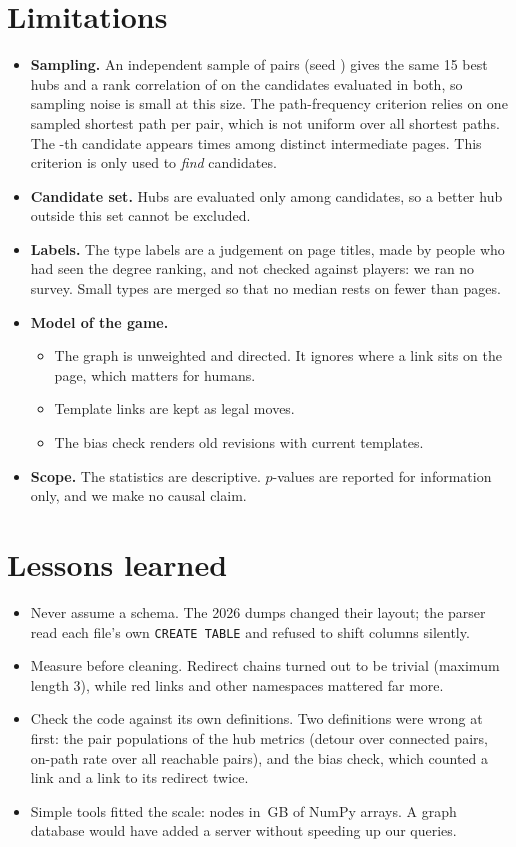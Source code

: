 \documentclass[10pt,a4paper]{article}
\begin{document}
\section{Limitations}
\begin{itemize}
\item \textbf{Sampling.} An independent sample of \NPairs{} pairs (seed \OtherSeed) gives the same
  15 best hubs \SeedTopFifteenOrder{} and a rank correlation of \SeedRho{} on the \SeedN{} candidates
  evaluated in both, so sampling noise is small at this size. The
  path-frequency criterion relies on one sampled shortest path per pair, which is not uniform over
  all shortest paths. The \TopK-th candidate appears \PathFreqKth{} times among
  \NDistinctOnPaths{} distinct intermediate pages. This criterion is only used to \emph{find}
  candidates.
\item \textbf{Candidate set.} Hubs are evaluated only among \NCandidates{} candidates, so a better
  hub outside this set cannot be excluded.
\item \textbf{Labels.} The type labels are a judgement on page titles, made by people who had
  seen the degree ranking, and not checked against players: we ran no survey. Small types are
  merged so that no median rests on fewer than \MinTypeSize{} pages.\item \textbf{Model of the game.}
  \begin{itemize}
  \item The graph is unweighted and directed. It ignores where a link sits on the page, which
    matters for humans.
  \item Template links are kept as legal moves.
  \item The bias check renders old revisions with current templates.
  \end{itemize}
\item \textbf{Scope.} The statistics are descriptive. $p$-values are reported for information
  only, and we make no causal claim.
\end{itemize}

\section{Lessons learned}
\begin{itemize}
\item Never assume a schema. The 2026 dumps changed their layout; the parser read each file's own
  \texttt{CREATE TABLE} and refused to shift columns silently.
\item Measure before cleaning. Redirect chains turned out to be trivial (maximum length 3), while
  red links and other namespaces mattered far more.
\item Check the code against its own definitions. Two definitions were wrong at first: the pair
  populations of the hub metrics (detour over connected pairs, on-path rate over all reachable
  pairs), and the bias check, which counted a link and a link to its redirect twice.
\item Simple tools fitted the scale: \NArticles{} nodes in \CsrDiskGB\,GB of NumPy arrays. A graph database
  would have added a server without speeding up our queries.
\end{itemize}
\end{document}
